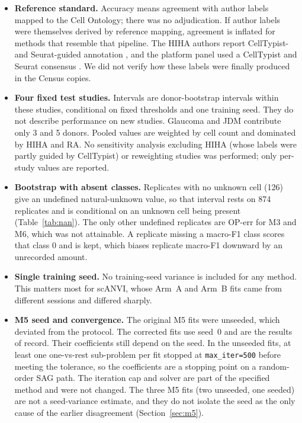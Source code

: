 \documentclass[11pt]{article}
\newcommand{\code}[1]{\texttt{#1}}
\begin{document}
\begin{itemize}
\item \textbf{Reference standard.} Accuracy means agreement with author labels mapped to the Cell Ontology; there was no adjudication. If author labels were themselves derived by reference mapping, agreement is inflated for methods that resemble that pipeline. The HIHA authors report CellTypist- and Seurat-guided annotation \citep{gong2025hiha}, and the platform panel used a CellTypist and Seurat consensus \citep{desimone2025platforms}. We did not verify how these labels were finally produced in the Census copies.
\item \textbf{Four fixed test studies.} Intervals are donor-bootstrap intervals within these studies, conditional on fixed thresholds and one training seed. They do not describe performance on new studies. Glaucoma and JDM contribute only 3 and 5 donors. Pooled values are weighted by cell count and dominated by HIHA and RA. No sensitivity analysis excluding HIHA (whose labels were partly guided by CellTypist) or reweighting studies was performed; only per-study values are reported.
\item \textbf{Bootstrap with absent classes.} Replicates with no unknown cell (126) give an undefined natural-unknown value, so that interval rests on 874 replicates and is conditional on an unknown cell being present (Table~\ref{tab:nan}). The only other undefined replicates are OP-err for M3 and M6, which was not attainable. A replicate missing a macro-F1 class scores that class 0 and is kept, which biases replicate macro-F1 downward by an unrecorded amount.
\item \textbf{Single training seed.} No training-seed variance is included for any method. This matters most for scANVI, whose Arm~A and Arm~B fits came from different sessions and differed sharply.
\item \textbf{M5 seed and convergence.} The original M5 fits were unseeded, which deviated from the protocol. The corrected fits use seed~0 and are the results of record. Their coefficients still depend on the seed. In the unseeded fits, at least one one-vs-rest sub-problem per fit stopped at \code{max\_iter=500} before meeting the tolerance, so the coefficients are a stopping point on a random-order SAG path. The iteration cap and solver are part of the specified method and were not changed. The three M5 fits (two unseeded, one seeded) are not a seed-variance estimate, and they do not isolate the seed as the only cause of the earlier disagreement (Section~\ref{sec:m5}).

\end{itemize}
\end{document}
